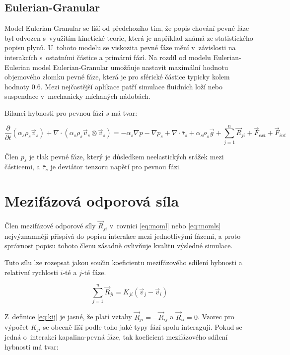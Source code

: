\subsection{Eulerian-Granular}
\label{sec:egm}
Model Eulerian-Granular se liší od předchozího tím, že  popis chování pevné fáze byl odvozen s~využitím kinetické teorie, která je například známá ze statistického popisu plynů. U~tohoto modelu se viskozita pevné fáze mění v~závislosti na interakcích s~ostatními částice a primární fází. Na rozdíl od modelu Eulerian-Eulerian model Eulerian-Granular umožňuje nastavit maximální hodnotu objemového zlomku pevné fáze, která je pro sférické částice typicky kolem hodnoty \num{0.6}. Mezi nejčastější aplikace patří simulace fluidních loží nebo suspendace v~mechanicky míchaných nádobách.

Bilanci hybnosti pro pevnou fázi $s$ má tvar:

\begin{equation}
	\frac{\partial}{\partial t} (\alpha_{s}\rho_{s}\vec{v}_{s}) + \nabla \cdot (\alpha_{s}\rho_{s} \vec{v}_{s} \otimes \vec{v}_{s}) = -\alpha_{s} \nabla p - \nabla p_{s} + \nabla \cdot \bar{\tau}_{s} + \alpha_{s}\rho_{s}\vec{g} + \sum_{j=1}^n \vec{R}_{ji} + \vec{F}_{ext} + \vec{F}_{int}
	\label{eq:momls}
\end{equation}
  
\noindent Člen $p_{s}$ je tlak pevné fáze, který je důsledkem neelastických srážek mezi částicemi, a $\bar{\tau}_{s}$ je deviátor tenzoru napětí pro pevnou fázi.       

\section{Mezifázová odporová síla}

Člen mezifázové odporové síly $\vec{R}_{ji}$ v~rovnici \ref{eq:moml} nebo \ref{eq:momls} nejvýznamněji přispívá do popisu interakce mezi jednotlivými fázemi, a proto správnost popisu tohoto členu zásadně ovlivňuje kvalitu výsledné simulace. 

Tuto sílu lze rozepsat jakou součin koeficientu mezifázového sdílení hybnosti a relativní rychlosti $i$-té a $j$-té fáze.

\begin{equation}
	\sum_{j=1}^n \vec{R}_{ji} = K_{ji} \left( \vec{v}_{j} - \vec{v}_{i} \right)
	\label{eq:kij}
\end{equation}

\noindent Z~definice \ref{eq:kij} je jasné, že platí vztahy $\vec{R}_{ji} = -\vec{R}_{ij}$ a $\vec{R}_{ii} = 0$. Vzorec pro výpočet $K_{ji}$ se obecně liší podle toho jaké typy fází spolu interagují. Pokud se jedná o~interakci kapalina-pevná fáze, tak koeficient mezifázového sdílení hybnosti má tvar:

